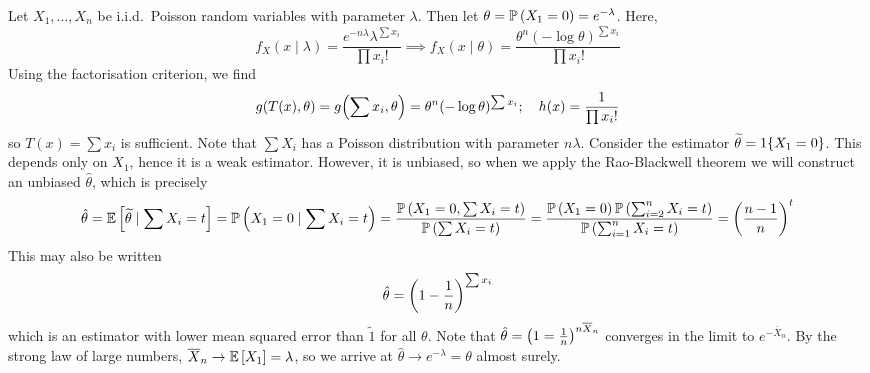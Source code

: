\begin{example}
	Let \( X_1, \dots, X_n \) be i.i.d.\ Poisson random variables with parameter \( \lambda \).
	Then let \( \theta = \mathbb{P}\left({X_1 = 0}\right) = e^{-\lambda} \).
	Here,
	\[ f_X(x \mid \lambda) = \frac{e^{-n \lambda} \lambda^{\sum x_i}}{\prod x_i!} \implies f_X(x \mid \theta) = \frac{\theta^n (-\log \theta)^{\sum x_i}}{\prod x_i!} \]
	Using the factorisation criterion, we find
	\[ g(T(x), \theta) = g\qty(\sum x_i, \theta) = \theta^n (-\log\theta)^{\sum x_i};\quad h(x) = \frac{1}{\prod x_i!} \]
	so \( T(x) = \sum x_i \) is sufficient.
	Note that \( \sum X_i \) has a Poisson distribution with parameter \( n \lambda \).
	Consider the estimator \( \widetilde \theta = 1\qty{X_1 = 0} \).
	This depends only on \( X_1 \), hence it is a weak estimator.
	However, it is unbiased, so when we apply the Rao-Blackwell theorem we will construct an unbiased \( \hat \theta \), which is precisely
	\[ \hat \theta = \mathbb{E}\left[{\widetilde \theta \mid \sum X_i = t}\right] = \mathbb{P}\left({X_1 = 0 \mid \sum X_i = t}\right) = \frac{\mathbb{P}\left({X_1 = 0, \sum X_i = t}\right)}{\mathbb{P}\left({\sum X_i = t}\right)} = \frac{\mathbb{P}\left({X_1 = 0}\right)\mathbb{P}\left({\sum_{i=2}^n X_i = t}\right)}{\mathbb{P}\left({\sum_{i=1}^n X_i = t}\right)} = \qty(\frac{n-1}{n})^t \]
	This may also be written
	\[ \hat \theta = \qty(1 - \frac{1}{n})^{\sum x_i} \]
	which is an estimator with lower mean squared error than \( \widetilde 1 \) for all \( \theta \).
	Note that \( \hat \theta = \qty(1 = \frac{1}{n})^{n \overline X_n} \) converges in the limit to \( e^{-\overline X_n} \).
	By the strong law of large numbers, \( \overline X_n \to \mathbb{E}\left[{X_1}\right] = \lambda \), so we arrive at \( \hat \theta \to e^{-\lambda} = \theta \) almost surely.
\end{example}

